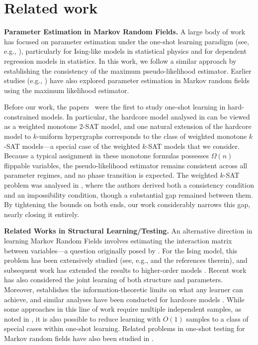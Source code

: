 \section{Related work}
\noindent \textbf{Parameter Estimation in Markov Random Fields.}  A large body of work has focused on parameter estimation under the one-shot learning paradigm (see, e.g., \cite{Chatterjee07c, BM18, DDK19, DDP20, GM20, DDDVK21, MSB}), particularly for Ising-like models in statistical physics and for dependent regression models in statistics. In this work, we follow a similar approach by establishing the consistency of the maximum pseudo-likelihood estimator.  Earlier studies (e.g., \cite{Gidas88, CometsGidas91, Comets92, GeyerThompson92}) have also explored parameter estimation in Markov random fields using the maximum likelihood estimator.

Before our work, the papers~\cite{BR21,GKK24} were the first to study one-shot learning in hard-constrained models. In particular, the hardcore model analysed in \cite{BR21} can be viewed as a weighted monotone $2$-SAT model, and one natural extension of the hardcore model to $k$-uniform hypergraphs corresponds to the class of weighted monotone $k$-SAT models—a special case of the weighted $k$-SAT models that we consider. Because a typical assignment in these monotone formulas possesses $\Omega(n)$ flippable variables, the pseudo-likelihood estimator remains consistent across all parameter regimes, and no phase transition is expected. 
The weighted $k$-SAT problem was analysed in \cite{GKK24}, where the authors derived both a consistency condition and an impossibility condition, though a substantial gap remained between them. By tightening the bounds on both ends, our work considerably narrows this gap, nearly closing it entirely.

\noindent\textbf{Related Works in Structural Learning/Testing.}
An alternative direction in learning Markov Random Fields involves estimating the interaction matrix between variables—a question originally posed by \cite{ChowLiu68}. For the Ising model, this problem has been extensively studied (see, e.g., \cite{Bresler15, VMLC16, BGS17} and the references therein), and subsequent work has extended the results to higher-order models \cite{KilvansMeka17, HKM17, GMM24}. Recent work \cite{ZhangKKW20, DDDVK21, GM24} has also considered the joint learning of both structure and parameters. Moreover, \cite{SanthanamWainwright12} establishes the information-theoretic limits on what any learner can achieve, and similar analyses have been conducted for hardcore models \cite{BGS14a, BGS14b}.
While some approaches in this line of work require multiple independent samples, as noted in \cite{DDDVK21}, it is also possible to reduce learning with $O(1)$ samples to a class of special cases within one-shot learning. 
Related problems in one-shot testing for Markov random fields have also been studied in \cite{BreslerNagaraj18,DDK18,MukherjeeMukherjeeYuan18,BBCSV20,BCSV21}.